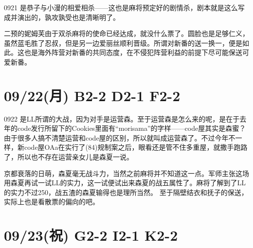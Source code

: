 0921 是恭子与小漫的相爱相杀——这也是麻将预定好的剧情杀，剧本就是这么写成并演出的，孰攻孰受也是清晰明了。

二预的妮姆芙由于双杀麻将的使命已经达成，就没什么票了。圆脸也是足够仁义，虽然蓝毛胜了忍叔，但是另一边爱丽丝顺利晋级。所谓对新番的送一换一，便是如此。这也是海外阵营对新番的共同态度，在不侵犯阵营利益的前提下尽可能保送可爱新番。

\section{09/22(月) B2-2 D2-1 F2-2}


0922 是LL所谓的大战，因为对手是运营森。至于运营森是怎么来的呢，是在于去年的code发行所留下的Cookies里面有“morisama”的字样——code屋其实是森蜜？由于很多人搞不清楚运营和code屋的区别，所以就叫成运营森了。不过今年不一样，新code屋OAa在实行了(84)规制案之后，眼看还是管不住多重屋，就撒手跑路了，所以也不存在运营亲女儿是森夏一说。

京都衰落的日萌，森夏毫无战斗力，当然之前麻将并不知道这一点。军师主张这场用森夏再试一试LL的实力，这一试便试出来森夏的战五属性了。麻将了解到了LL的实力不过250，战五渣的森夏输得也是理所当然。
至于隔壁结衣和抚子的保送，实际上也是看散票的偏向的吧。

\section{09/23(祝) G2-2 I2-1 K2-2}

